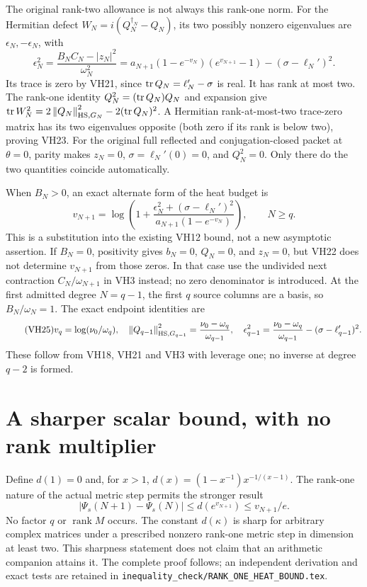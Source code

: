 The original rank-two allowance is not always this rank-one norm.
For the Hermitian defect \(W_N=i(Q_N^{\dagger_N}-Q_N)\), its two
possibly nonzero eigenvalues are \(\epsilon_N,-\epsilon_N\), with
\begin{equation}\tag{VH23}\label{hvh:VH23}
\boxed{\quad
\epsilon_N^2=\frac{B_NC_N-|z_N|^2}{\omega_N^2}
=a_{N+1}(1-e^{-v_N})(e^{v_{N+1}}-1)
-(\sigma-\ell_N')^2.\quad}
\end{equation}
Its trace is zero by VH21, since \(\operatorname{tr} Q_N=\ell_N'-\sigma\) is real.
It has rank at most two. The rank-one identity
\(Q_N^2=(\operatorname{tr} Q_N)Q_N\) and expansion give
\(\operatorname{tr} W_N^2=2\left\lVert Q_N\right\rVert_{\mathrm{HS},G_N}^2-2(\operatorname{tr} Q_N)^2\).
A Hermitian rank-at-most-two trace-zero matrix has its two eigenvalues
opposite (both zero if its rank is below two), proving VH23.
For the original full reflected and conjugation-closed packet at
\(\theta=0\), parity makes \(z_N=0\), \(\sigma=\ell_N'(0)=0\),
and \(Q_N^2=0\). Only there do the two quantities coincide automatically.

When \(B_N>0\), an exact alternate form of the heat budget is
\begin{equation}\tag{VH24}\label{hvh:VH24}
v_{N+1}=\log\!\left(1+
\frac{\epsilon_N^2+(\sigma-\ell_N')^2}
{a_{N+1}(1-e^{-v_N})}\right),\qquad N\ge q.
\end{equation}
This is a substitution into the existing VH12 bound, not a new
asymptotic assertion. If \(B_N=0\), positivity gives \(b_N=0\),
\(Q_N=0\), and \(z_N=0\), but VH22 does not determine \(v_{N+1}\)
from those zeros. In that case use the undivided next contraction
\(C_N/\omega_{N+1}\) in VH3 instead; no zero denominator is introduced.
At the first admitted degree \(N=q-1\), the first \(q\) source columns
are a basis, so \(B_N/\omega_N=1\). The exact endpoint identities are
\begin{equation}\tag{VH25}\label{hvh:VH25}
v_q=\log(\nu_0/\omega_q),\quad
\left\lVert Q_{q-1}\right\rVert_{\mathrm{HS},G_{q-1}}^2
=\frac{\nu_0-\omega_q}{\omega_{q-1}},\quad
\epsilon_{q-1}^2=\frac{\nu_0-\omega_q}{\omega_{q-1}}
-(\sigma-\ell_{q-1}')^2.
\end{equation}
These follow from VH18, VH21 and VH3 with leverage one; no inverse
at degree \(q-2\) is formed.

\section{A sharper scalar bound, with no rank multiplier}

Define \(d(1)=0\) and, for \(x>1\),
\(d(x)=(1-x^{-1})x^{-1/(x-1)}\). The rank-one nature of the actual
metric step permits the stronger result
\begin{equation}\tag{VH26}\label{hvh:VH26}
\boxed{\quad
|\Psi_s(N+1)-\Psi_s(N)|\le d(e^{v_{N+1}})
\le v_{N+1}/e.\quad}
\end{equation}
No factor \(q\) or \(\operatorname{rank}M\) occurs. The constant
\(d(\kappa)\) is sharp for arbitrary complex matrices under a prescribed
nonzero rank-one metric step in dimension at least two. This sharpness
statement does not claim that an arithmetic companion attains it.
The complete proof follows; an independent derivation and exact tests
are retained in \texttt{inequality\_check/RANK\_ONE\_HEAT\_BOUND.tex}.

